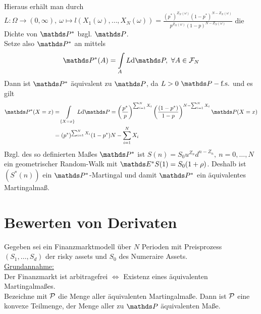\begin{enumerate}[(a)]
\[	\]
	Hieraus erhält man durch $L:\Omega\to(0,\infty),~\omega\mapsto l(X_1(\omega),\dots,X_N(\omega))=\frac{(p^*)^{Z_N(\omega)}(1-p^*)^{N-Z_N(\omega)}}{p^{Z_N(\omega)}(1-p)^{N-Z_N(\omega)}}$ die Dichte von $\Pw^*$ bzgl. $\Pw$.\\
	Setze also $\Pw^*$ an mittels
	\[
	\Pw^*(A)=\int\limits_A L\dint \Pw,~\forall A\in \F_N
	\]
	Dann ist $\Pw^*$ äquivalent zu $\Pw$, da $L>0~\Pfs$ und es gilt
	\begin{equation*}
	\begin{aligned}
		\Pw^*(X=x) &= \int\limits_{\{X=x\}}L\dint \Pw=\enbrace{\frac{p^*}{p}}^{\sum_{i=1}^{N}X_i}\enbrace{\frac{(1-p^*)}{1-p}}^{N-\sum_{i=1}^{N}X_i} \Pw(X=x)\\
		&= (p^*)^{\sum_{i=1}^{N}X_i}(1-p^*){N-\sum_{i=1}^{N}X_i}
	\end{aligned}
	\end{equation*}
	Bzgl. des so definierten Maßes $\Pw^*$ ist $S(n)=S_0u^{Z_n}d^{n-Z_n},~n=0,\dots,N$ ein geometrischer Random-Walk mit $\E^*S(1)=S_0(1+\rho)$.
	Deshalb ist $(S^*(n))$ ein $\Pw^*$-Martingal und damit $\Pw^*$ ein äquivalentes Martingalmaß.
\end{enumerate}

\newpage
\section{Bewerten von Derivaten}
\label{sec:bewerten_derivate}
Gegeben sei ein Finanzmarktmodell über $N$ Perioden mit Preisprozess $(S_1,\dots,S_d)$ der risky assets und $S_0$ des Numeraire Assets.\\

\uline{Grundannahme:}\\
Der Finanzmarkt ist arbitragefrei $\Leftrightarrow$ Existenz eines äquivalenten Martingalmaßes.\\
Bezeichne mit $\mathcal{P}$ die Menge aller äquivalenten Martingalmaße.
Dann ist $\mathcal{P}$ eine konvexe Teilmenge, der Menge aller zu $\Pw$ äquivalenten Maße.

